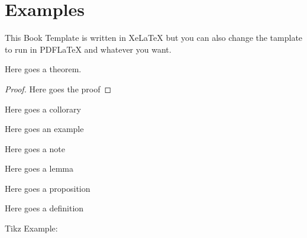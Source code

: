 
\section{Examples}

This Book Template is written in XeLaTeX but you can also change the tamplate to run in PDFLaTeX and whatever you want.\\


\lipsum[1]

\begin{theorem}
    Here goes a theorem.
    \lipsum[1]
\end{theorem}

\begin{proof}
        Here goes the proof

    \lipsum[2]
\end{proof}


\begin{corollary}
    Here goes a collorary
\end{corollary}

\begin{eg}
    Here goes an example
\end{eg}

\begin{note}
    Here goes a note 

    \lipsum[2]
\end{note}


\begin{lemma}
    Here goes a lemma
\end{lemma}

\begin{prop}
    Here goes a proposition
\end{prop}


\begin{definition}
    Here goes a definition 

    \lipsum[2]
\end{definition}

\lipsum[1-2] Tikz Example:

